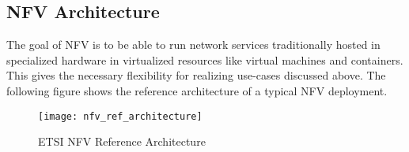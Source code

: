 \subsection{NFV Architecture}

The goal of NFV  is to be able to run network services traditionally hosted in specialized hardware in virtualized resources like virtual machines and containers. This gives the necessary flexibility for realizing use-cases discussed above.  The following figure shows the reference architecture of a typical NFV deployment. 

\begin{figure}
	\centering
	\texttt{[image: nfv\_ref\_architecture]}
	\label{fig:Figure 3}
	\caption{ETSI NFV Reference Architecture}
\end{figure}
